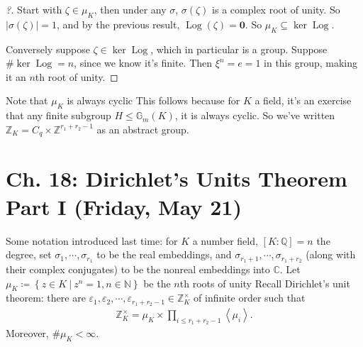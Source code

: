 \begin{proof}[?]

Start with \(\zeta\in \mu_K\), then under any \(\sigma\),
\(\sigma(\zeta)\) is a complex root of unity. So
\({\left\lvert {\sigma(\zeta)} \right\rvert} = 1\), and by the previous
result, \(\operatorname{Log}(\zeta) = \mathbf{0}\). So
\(\mu_K \subseteq \ker \operatorname{Log}\).

Conversely suppose \(\zeta\in \ker \operatorname{Log}\), which in
particular is a group. Suppose \(\# \ker \operatorname{Log}= n\), since
we know it's finite. Then \(\xi^n = e = 1\) in this group, making it an
\(n\)th root of unity.

\end{proof}

\begin{remark}

Note that \(\mu_K\) is always cyclic This follows because for \(K\) a
field, it's an exercise that any finite subgroup
\(H\leq {\mathbb{G}}_m(K)\), it is always cyclic. So we've written
\({\mathbb{Z}}_K = C_q \times {\mathbb{Z}}^{r_1 + r_2 - 1}\) as an
abstract group.

\end{remark}

\hypertarget{ch.-18-dirichlets-units-theorem-part-i-friday-may-21}{%
\section{Ch. 18: Dirichlet's Units Theorem Part I (Friday, May
21)}\label{ch.-18-dirichlets-units-theorem-part-i-friday-may-21}}

\begin{remark}

Some notation introduced last time: for \(K\) a number field,
\([K: {\mathbb{Q}}] = n\) the degree, set
\(\sigma_{1}, \cdots, \sigma_{r_1}\) to be the real embeddings, and
\(\sigma_{r_1 + 1}, \cdots, \sigma_{r_1 + r_2}\) (along with their
complex conjugates) to be the nonreal embeddings into \({\mathbb{C}}\).
Let
\(\mu_K \coloneqq\left\{{ z\in K {~\mathrel{\Big|}~}z^n = 1, n\in {\mathbb{N}}}\right\}\)
be the \(n\)th roots of unity Recall Dirichlet's unit theorem: there are
\({ {\varepsilon}_1, {\varepsilon}_2, \cdots, {\varepsilon}_{r_1+r_2-1}} \in {\mathbb{Z}}_K^{\times}\)
of infinite order such that
\begin{align*}
{\mathbb{Z}}_K^{\times}= \mu_K \times \prod_{i\leq r_1 + r_2 -1} \left\langle{ \mu_i }\right\rangle 
.\end{align*}
Moreover, \(\# \mu_K < \infty\).

\end{remark}

